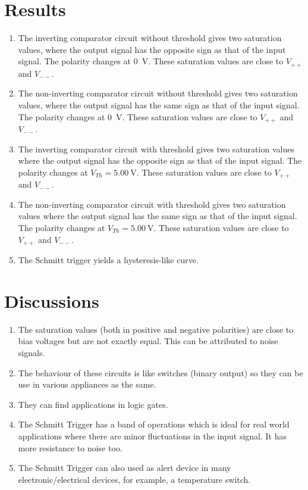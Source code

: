 \section{Results}
\begin{enumerate}
    \item The inverting comparator circuit without threshold gives two saturation values, where the output signal has the opposite sign as that of the input signal. The polarity changes at \SI{0}{\volt}. These saturation values are close to $V_{++}$ and $V_{--}$.
    \item The non-inverting comparator circuit without threshold gives two saturation values, where the output signal has the same sign as that of the input signal. The polarity changes at \SI{0}{\volt}. These saturation values are close to $V_{++}$ and $V_{--}$.
    \item The inverting comparator circuit with threshold gives two saturation values where the output signal has the opposite sign as that of the input signal. The polarity changes at $V_{Th} = \SI{5.00}{\volt}$. These saturation values are close to $V_{++}$ and $V_{--}$.
    \item The non-inverting comparator circuit with threshold gives two saturation values where the output signal has the same sign as that of the input signal. The polarity changes at $V_{Th} = \SI{5.00}{\volt}$. These saturation values are close to $V_{++}$ and $V_{--}$.
    \item The Schmitt trigger yields a hysteresis-like curve.
\end{enumerate}
\section{Discussions}
\begin{enumerate}
    \item The saturation values (both in positive and negative polarities) are close to bias voltages but are not exactly equal. This can be attributed to noise signals.
    \item The behaviour of these circuits is like switches (binary output) so they can be use in various appliances as the same.
    \item They can find applications in logic gates.
    \item The Schmitt Trigger has a band of operations which is ideal for real world applications where there are minor fluctuations in the input signal. It has more resistance to noise too.
    \item The Schmitt Trigger can also used as alert device in many electronic/electrical devices, for example, a temperature switch.
\end{enumerate}
